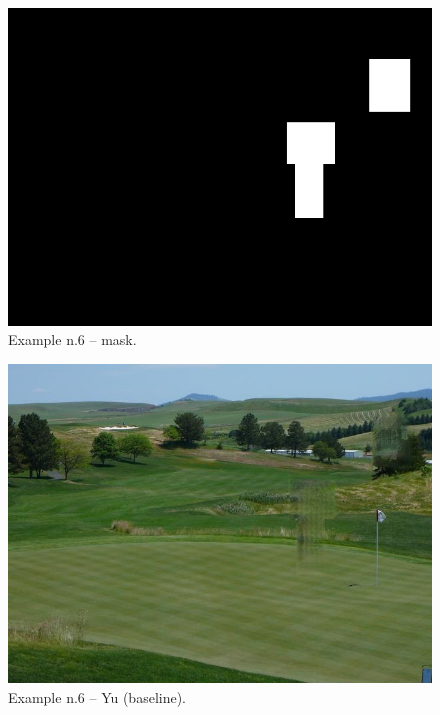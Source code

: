 \documentclass[a4paper, 11pt]{article}
\begin{document}
\begin{figure}
    \centering
    \includegraphics[width=.95\linewidth]{documentation/img/masks/0041_mask.png}
    \caption{Example n.6 -- mask.}
    \label{img:ex_n.6_mask}
\end{figure}
\begin{figure}
    \centering
    \includegraphics[width=.95\linewidth]{documentation/img/baseline/0041.png}
    \caption{Example n.6 -- Yu (baseline).}
    \label{img:ex_n.6_mask}
\end{figure}
\end{document}
